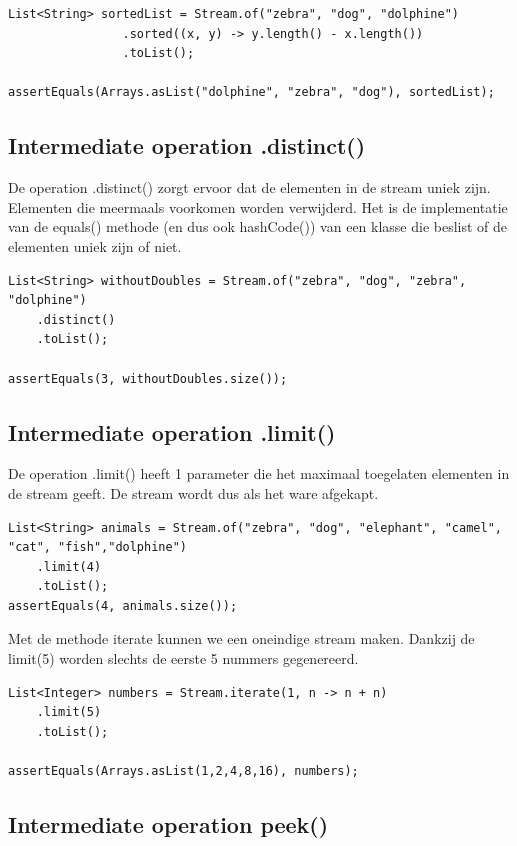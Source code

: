 \begin{lstlisting}
List<String> sortedList = Stream.of("zebra", "dog", "dolphine")
				.sorted((x, y) -> y.length() - x.length())
				.toList();
		
assertEquals(Arrays.asList("dolphine", "zebra", "dog"), sortedList);
\end{lstlisting}

\subsection{Intermediate operation .distinct()}

De operation .distinct() zorgt ervoor dat de elementen in de stream uniek zijn. Elementen die meermaals voorkomen worden verwijderd. Het is de implementatie van de equals() methode (en dus ook hashCode()) van een klasse die beslist of de elementen uniek zijn of niet.

\begin{lstlisting}
List<String> withoutDoubles = Stream.of("zebra", "dog", "zebra", "dolphine")
    .distinct()
    .toList();
    
assertEquals(3, withoutDoubles.size());
\end{lstlisting}

\subsection{Intermediate operation .limit()}

De operation .limit() heeft 1 parameter die het maximaal toegelaten elementen in de stream geeft.
De stream wordt dus als het ware afgekapt.

\begin{lstlisting}
List<String> animals = Stream.of("zebra", "dog", "elephant", "camel", "cat", "fish","dolphine")
    .limit(4)
    .toList();
assertEquals(4, animals.size());
\end{lstlisting}

Met de methode iterate kunnen we een oneindige stream maken. Dankzij de limit(5) worden slechts de eerste 5 nummers gegenereerd.

\begin{lstlisting}
List<Integer> numbers = Stream.iterate(1, n -> n + n)
    .limit(5)
    .toList();

assertEquals(Arrays.asList(1,2,4,8,16), numbers);
\end{lstlisting}


\subsection{Intermediate operation peek()}

